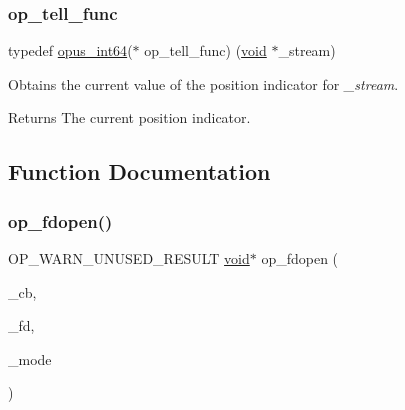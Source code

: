 \subsubsection{\texorpdfstring{op\+\_\+tell\+\_\+func}{op\_tell\_func}}
{\footnotesize\ttfamily typedef \hyperlink{opus__types_8h_ab6742070cf9d0ccffca2b80522b4f41a}{opus\+\_\+int64}($\ast$ op\+\_\+tell\+\_\+func) (\hyperlink{png_8h_ac9c84fa68bbad002983e35ce3663c686}{void} $\ast$\+\_\+stream)}

Obtains the current value of the position indicator for {\itshape \+\_\+stream}. \begin{DoxyReturn}{Returns}
The current position indicator. 
\end{DoxyReturn}


\subsection{Function Documentation}
\mbox{\label{group__stream__callbacks_gac1843b587e14570e616f8cc7c4501961}} 
\subsubsection{\texorpdfstring{op\+\_\+fdopen()}{op\_fdopen()}}
{\footnotesize\ttfamily O\+P\+\_\+\+W\+A\+R\+N\+\_\+\+U\+N\+U\+S\+E\+D\+\_\+\+R\+E\+S\+U\+LT \hyperlink{png_8h_ac9c84fa68bbad002983e35ce3663c686}{void}$\ast$ op\+\_\+fdopen (\begin{DoxyParamCaption}\item[{\hyperlink{struct_opus_file_callbacks}{Opus\+File\+Callbacks} $\ast$}]{\+\_\+cb,  }\item[{int}]{\+\_\+fd,  }\item[{\hyperlink{zconf_8h_a2c212835823e3c54a8ab6d95c652660e}{const} char $\ast$}]{\+\_\+mode }\end{DoxyParamCaption})}


